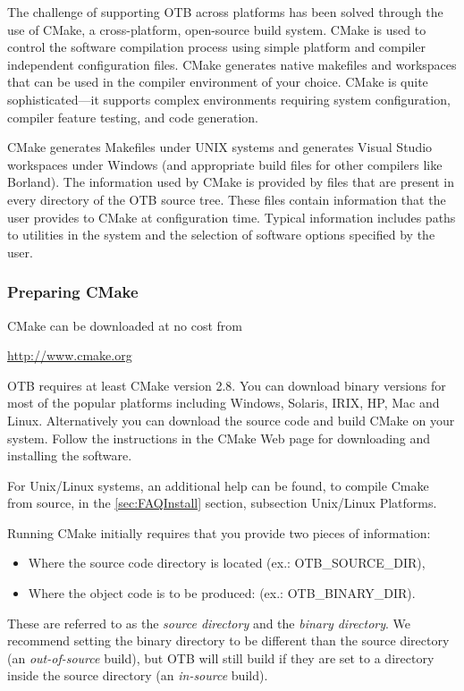 
The challenge of supporting OTB across platforms has been solved through the
use of CMake, a cross-platform, open-source build system. CMake is used to
control the software compilation process using simple platform and compiler
independent configuration files.  CMake generates native makefiles and
workspaces that can be used in the compiler environment of your choice. CMake
is quite sophisticated---it supports complex environments requiring system
configuration, compiler feature testing, and code generation.

CMake generates Makefiles under UNIX systems and generates Visual
Studio workspaces under Windows (and appropriate build files for other
compilers like Borland). The information used by CMake is provided by
 files that are present in every directory of the OTB
source tree. These files contain information that the user
provides to CMake at configuration time. Typical information includes paths
to utilities in the system and the selection of software options specified by
the user.

\subsubsection{Preparing CMake}
\label{sec:CMakeforOTB}


CMake can be downloaded at no cost from
\begin{center}
  \url{http://www.cmake.org}
\end{center}

OTB requires at least CMake version 2.8. You can download binary
versions for most of the popular platforms including Windows, Solaris,
IRIX, HP, Mac and Linux. Alternatively you can download the source
code and build CMake on your system. Follow the instructions in the
CMake Web page for downloading and installing the software.

For Unix/Linux systems, an additional help can be found, to compile Cmake from source, in the \ref{sec:FAQInstall}
section, subsection Unix/Linux Platforms.

Running CMake initially requires that you provide two pieces of
information: 
\begin{itemize}
\item Where the source code directory is located (ex.: OTB\_SOURCE\_DIR),
\item Where the object code is to be produced: (ex.: OTB\_BINARY\_DIR). 
\end{itemize}
These are referred to as the \emph{source directory} and the \emph{binary directory}.
We recommend setting the binary directory to be different than the source directory (an
\emph{out-of-source} build), but OTB will still build if they are set
to a directory inside the source directory (an \emph{in-source} build). 

